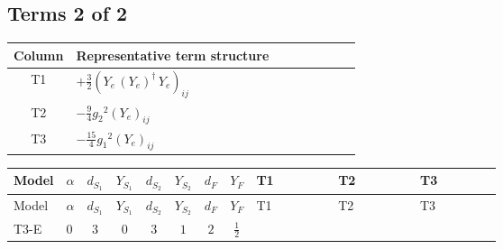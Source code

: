 \documentclass[8pt]{article}
\begin{document}
\begin{landscape}
\subsection*{Terms 2 of 2}
\begin{center}
\begin{tabular}{@{}c >{\raggedright\arraybackslash}p{0.82\linewidth}@{}}
\toprule
Column & Representative term structure \\
\midrule
T1 & \(\displaystyle +\frac{3}{2} \left({Y_e}\,\left({Y_e}\right)^{\dagger}\,{Y_e}\right)_{ij}\) \\
\midrule
T2 & \(\displaystyle -\frac{9}{4} {g_2}^2 \left({Y_e}\right)_{ij}\) \\
\midrule
T3 & \(\displaystyle -\frac{15}{4} {g_1}^2 \left({Y_e}\right)_{ij}\) \\
\midrule
\bottomrule
\end{tabular}
\end{center}
\smallskip
\tiny
\begin{longtable}{@{}llcccccc >{\raggedright\arraybackslash}p{0.21\linewidth} >{\raggedright\arraybackslash}p{0.21\linewidth} >{\raggedright\arraybackslash}p{0.21\linewidth}@{}}
\toprule
Model & $\alpha$ & $d_{S_1}$ & $Y_{S_1}$ & $d_{S_2}$ & $Y_{S_2}$ & $d_F$ & $Y_F$ & T1 & T2 & T3 \\
\midrule
\endfirsthead
\toprule
Model & $\alpha$ & $d_{S_1}$ & $Y_{S_1}$ & $d_{S_2}$ & $Y_{S_2}$ & $d_F$ & $Y_F$ & T1 & T2 & T3 \\
\midrule
\endhead
T3-E & $0$ & $3$ & $0$ & $3$ & $1$ & $2$ & $\frac{1}{2}$ & \scriptsize\adjustbox{max width=\linewidth}{$\begin{gathered} +\frac{3}{2} \left({Y_e}\,\left({Y_e}\right)^{\dagger}\,{Y_e}\right)_{ij}\end{gathered}$} & \scriptsize\adjustbox{max width=\linewidth}{$\begin{gathered} -\frac{9}{4} {g_2}^2 \left({Y_e}\right)_{ij}\end{gathered}$} & \scriptsize\adjustbox{max width=\linewidth}{$\begin{gathered} -\frac{15}{4} {g_1}^2 \left({Y_e}\right)_{ij}\end{gathered}$} \\
\midrule
\bottomrule
\end{longtable}
\clearpage

\end{landscape}
\end{document}
